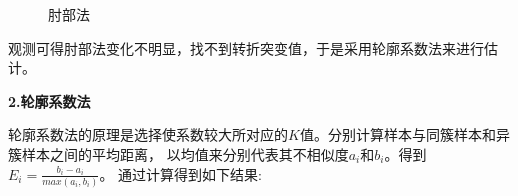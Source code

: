 \documentclass[UTF8]{ctexart}
\begin{document}
                \begin{figure}[htbp]
                    \centering
                    \caption{肘部法}
                    \label{fig}
                \end{figure}

                观测可得肘部法变化不明显，找不到转折突变值，于是采用轮廓系数法来进行估计。

                \textbf{2.轮廓系数法}

                轮廓系数法的原理是选择使系数较大所对应的$K$值。分别计算样本与同簇样本和异簇样本之间的平均距离，
                以均值来分别代表其不相似度$a_i$和$b_i$。得到$E_i = \frac{b_i-a_i}{max(a_i,b_i)}$。
                通过计算得到如下结果:
\end{document}
